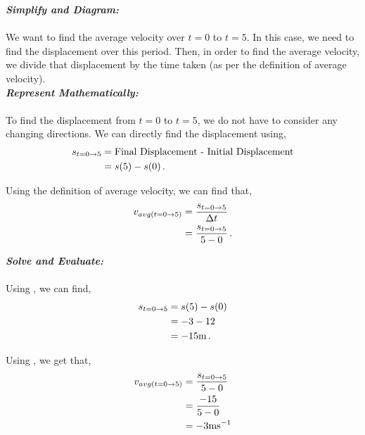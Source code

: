 \begin{subquestions}
\begin{subsubquestions}
\begin{subsubsubquestions}
			\textbf{\textit{Simplify and Diagram:}} \\ \\
			We want to find the average velocity over $t=0$ to $t=5$. In this case, we need to find the displacement over this period. Then, in order to find the average velocity, we divide that displacement by the time taken (as per the definition of average velocity). \\
			
			
			
			\textbf{\textit{Represent Mathematically:}} \\ \\
			To find the displacement from $t=0$ to $t=5$, we do not have to consider any changing directions. We can directly find the displacement using,
			\begin{align}
				s_{t=0 \rightarrow 5} & = \text{Final Displacement - Initial Displacement} \nonumber \\
				& =  s(5)-s(0) \,. \label{2014:q5*:Seqn4} 
			\end{align}
			
			Using the definition of average velocity, we can find that,
			\begin{align}
				v_{avg(t=0 \rightarrow 5)} & = \frac{s_{t=0 \rightarrow 5}}{\Delta t} \nonumber \\
				& = \frac{s_{t=0 \rightarrow 5}}{5-0} \,. \label{2014:q5*:Seqn5}
			\end{align}
			
			
			
			\textbf{\textit{Solve and Evaluate:}} \\ \\
			Using , we can find,
			\begin{align}
				s_{t=0 \rightarrow 5} & =  s(5)-s(0) \nonumber \\
				& = -3 - 12 \nonumber \\
				& = -15 \text{m} \,.
			\end{align}
			
			Using , we get that,
			\begin{align}
				v_{avg(t=0 \rightarrow 5)} & =\frac{s_{t=0 \rightarrow 5}}{5-0} \nonumber \\
				& = \frac{-15}{5-0} \nonumber \\
				& = -3 \text{ms}^{-1} 
			\end{align}
			
			

\end{subsubsubquestions}
\end{subsubquestions}
\end{subquestions}
